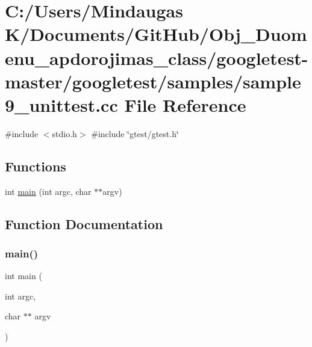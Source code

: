 \hypertarget{googletest-master_2googletest_2samples_2sample9__unittest_8cc}{}\section{C\+:/\+Users/\+Mindaugas K/\+Documents/\+Git\+Hub/\+Obj\+\_\+\+Duomenu\+\_\+apdorojimas\+\_\+class/googletest-\/master/googletest/samples/sample9\+\_\+unittest.cc File Reference}
\label{googletest-master_2googletest_2samples_2sample9__unittest_8cc}
{\ttfamily \#include $<$stdio.\+h$>$}\newline
{\ttfamily \#include \char`\"{}gtest/gtest.\+h\char`\"{}}\newline
\subsection*{Functions}
\begin{DoxyCompactItemize}
\item 
int \mbox{\hyperlink{googletest-master_2googletest_2samples_2sample9__unittest_8cc_a3c04138a5bfe5d72780bb7e82a18e627}{main}} (int argc, char $\ast$$\ast$argv)
\end{DoxyCompactItemize}


\subsection{Function Documentation}
\mbox{\label{googletest-master_2googletest_2samples_2sample9__unittest_8cc_a3c04138a5bfe5d72780bb7e82a18e627}} 
\subsubsection{\texorpdfstring{main()}{main()}}
{\footnotesize\ttfamily int main (\begin{DoxyParamCaption}\item[{int}]{argc,  }\item[{char $\ast$$\ast$}]{argv }\end{DoxyParamCaption})}

